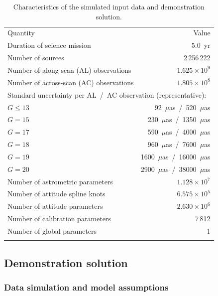 \documentclass[structabstract]{aa}
\begin{document}
\begin{table}
\caption{Characteristics of the simulated input data and demonstration solution.}
\label{tab:sim}
\centering
\begin{tabular}{l r}
\hline\hline\noalign{\smallskip}
Quantity & Value \\
\noalign{\smallskip}\hline\noalign{\smallskip}
Duration of science mission & 5.0~yr \\
Number of sources & 2\,256\,222 \\
Number of along-scan (AL) observations & $1.625\times 10^9$ \\
Number of across-scan (AC) observations & $1.805\times 10^8$ \\
\multicolumn{2}{l}{Standard uncertainty per AL~/~AC observation (representative):}\\
\qquad $G\le 13$ &  92~$\mu$as~/~\phantom{00}520~$\mu$as \\
\qquad $G=15$ &   230~$\mu$as~/~\phantom{0}1350~$\mu$as \\
\qquad $G=17$ &   590~$\mu$as~/~\phantom{0}4000~$\mu$as \\
\qquad $G=18$ &   960~$\mu$as~/~\phantom{0}7600~$\mu$as \\
\qquad $G=19$ & 1600~$\mu$as~/~\phantom{}16000~$\mu$as \\
\qquad $G=20$ & 2900~$\mu$as~/~\phantom{}38000~$\mu$as \\
Number of astrometric parameters & $1.128\times 10^7$ \\
Number of attitude spline knots & $6.575\times 10^5$ \\
Number of attitude parameters & $2.630\times 10^6$ \\
Number of calibration parameters & 7\,812 \\
Number of global parameters & 1 \\
\noalign{\smallskip}\hline
\end{tabular}
\end{table}





\subsection{Demonstration solution\label{sec:agis-results}}

\subsubsection{Data simulation and model assumptions}\label{sec:simu}
\end{document}
